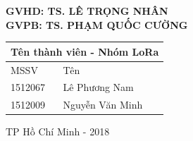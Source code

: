 \begin{boxedminipage}[t]{15.5cm}
\begin{boxedminipage}[t]{15.4cm}
\begin{titlepage}
\begin{center}
\bf GVHD: TS. LÊ TRỌNG NHÂN\\
\bf GVPB: TS. PHẠM QUỐC CƯỜNG
\end{center}
\vspace{0.5cm}
\begin{flushright}
			{
				\begin{tabular}{|l|l|}
					\multicolumn{2}{l}{Tên thành viên - Nhóm LoRa} \\ 
					\hline
					MSSV & Tên \\ 
					\hline
					1512067 & Lê Phương Nam \\ 
					1512009 & Nguyễn Văn Minh \\ 
					\hline
				\end{tabular}
			}
		\end{flushright}
\vfill
\begin{center}
TP Hồ Chí Minh - 2018
\end{center}
\end{titlepage}
\end{boxedminipage}
\end{boxedminipage}